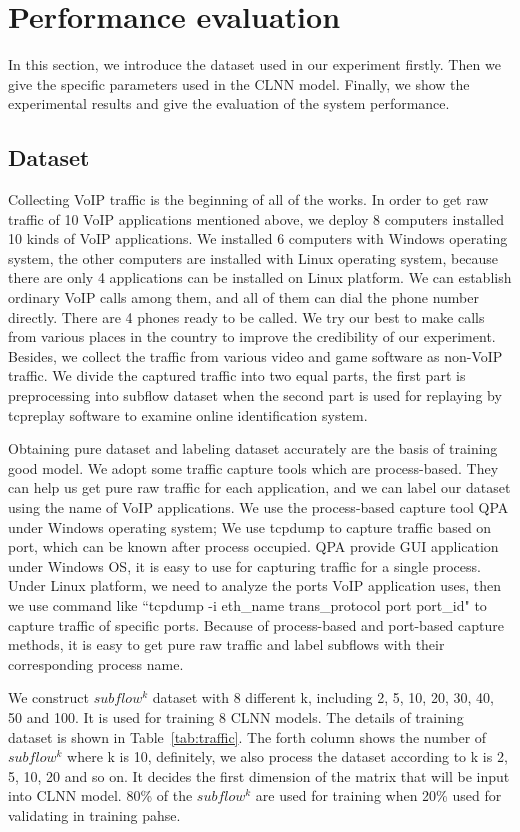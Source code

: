 \documentclass[conference]{IEEEtran}
\begin{document}
\section{Performance evaluation}
\label{sec:performanceevaluation}
In this section, we introduce the dataset used in our experiment firstly. Then we give the specific parameters used in the CLNN model. Finally, we show the experimental results and give the evaluation of the system performance.
\subsection{Dataset}
\label{sec:dataset}
Collecting VoIP traffic is the beginning of all of the works. In order to get raw traffic of 10 VoIP applications mentioned above, we deploy 8 computers installed 10 kinds of VoIP applications. We installed 6 computers with Windows operating system, the other computers are installed with Linux operating system, because there are only 4 applications can be installed on Linux platform. We can establish ordinary VoIP calls among them, and all of them can dial the phone number directly. There are 4 phones ready to be called. We try our best to make calls from various places in the country to improve the credibility of our experiment. Besides, we collect the traffic from various video and game software as non-VoIP traffic. We divide the captured traffic into two equal parts, the first part is preprocessing into subflow dataset when the second part is used for replaying by tcpreplay software to examine online identification system.

Obtaining pure dataset and labeling dataset accurately are the basis of training good model. We adopt some traffic capture tools which are process-based. They can help us get pure raw traffic for each application, and we can label our dataset using the name of VoIP applications. We use the process-based capture tool QPA under Windows operating system; We use tcpdump to capture traffic based on port, which can be known after process occupied. QPA provide GUI application under Windows OS, it is easy to use for capturing traffic for a single process. Under Linux platform, we need to analyze the ports VoIP application uses, then we use command like ``tcpdump -i eth\_name trans\_protocol port port\_id" to capture traffic of specific ports. Because of process-based and port-based capture methods, it is easy to get pure raw traffic and label subflows with their corresponding process name.


We construct $subflow^k$ dataset with 8 different k, including 2, 5, 10, 20, 30, 40, 50 and 100. It is used for training 8 CLNN models. The details of training dataset is shown in Table~\ref{tab:traffic}. The forth column shows the number of $subflow^k$ where k is 10, definitely, we also process the dataset according to k is 2, 5, 10, 20 and so on. It decides the first dimension of the matrix that will be input into CLNN model. 80\% of the $subflow^k$ are used for training when 20\% used for validating in training pahse.
\end{document}
